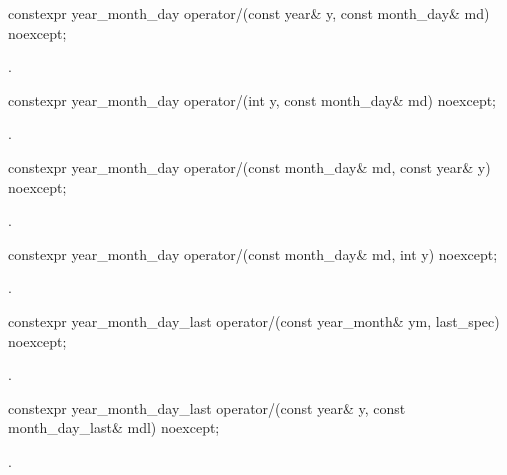 \begin{itemdecl}
constexpr year_month_day
  operator/(const year& y, const month_day& md) noexcept;
\end{itemdecl}

\begin{itemdescr}
\pnum
\returns
{}.
\end{itemdescr}

\begin{itemdecl}
constexpr year_month_day
  operator/(int y, const month_day& md) noexcept;
\end{itemdecl}

\begin{itemdescr}
\pnum
\returns
{}.
\end{itemdescr}

\begin{itemdecl}
constexpr year_month_day
  operator/(const month_day& md, const year& y) noexcept;
\end{itemdecl}

\begin{itemdescr}
\pnum
\returns
{}.
\end{itemdescr}

\begin{itemdecl}
constexpr year_month_day
  operator/(const month_day& md, int y) noexcept;
\end{itemdecl}

\begin{itemdescr}
\pnum
\returns
{}.
\end{itemdescr}

\begin{itemdecl}
constexpr year_month_day_last
  operator/(const year_month& ym, last_spec) noexcept;
\end{itemdecl}

\begin{itemdescr}
\pnum
\returns
{}.
\end{itemdescr}

\begin{itemdecl}
constexpr year_month_day_last
  operator/(const year& y, const month_day_last& mdl) noexcept;
\end{itemdecl}

\begin{itemdescr}
\pnum
\returns
{}.
\end{itemdescr}

